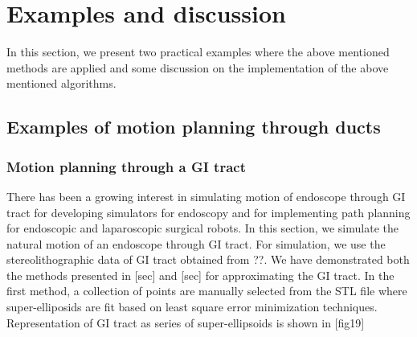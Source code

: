 \documentclass[12pt,a4]{article}
\begin{document}
\section{Examples and discussion}
In this section, we present two practical examples where the above mentioned methods are applied and some discussion on the implementation of the above mentioned algorithms.
\subsection{Examples of motion planning through ducts}
\subsubsection{Motion planning through a GI tract}
There has been a growing interest in simulating motion of endoscope through GI tract for developing simulators for endoscopy and for implementing path planning for endoscopic and laparoscopic surgical robots. In this section, we simulate the natural motion of an endoscope through GI tract. For simulation, we use the stereolithographic data of GI tract obtained from ??. We have demonstrated both the methods presented in [sec] and [sec] for approximating the GI tract. In the first method, a collection of points are manually selected from the STL file where super-elliposids are fit based on least square error minimization techniques. Representation of GI tract as series of super-ellipsoids is shown in [fig19]
\end{document}
